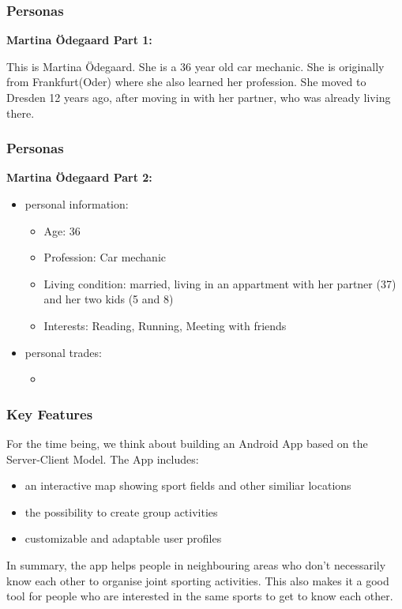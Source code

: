 \documentclass[aspectratio=169]{beamer}
\begin{document}
\begin{frame}   
	\frametitle{Personas}{\textbf{Martina Ödegaard Part 1:}}

	This is Martina Ödegaard. She is a 36 year old car mechanic. She is originally from Frankfurt(Oder) where she also learned her profession. She moved to Dresden 12 years ago, after moving in with her partner, who was already living there. 
\end{frame}

\begin{frame}   
	\frametitle{Personas}{\textbf{Martina Ödegaard Part 2:}}

\begin{itemize}
	\item personal information:
	\begin{itemize}
		\item Age: 36
		\item Profession: Car mechanic
		\item Living condition: married, living in an appartment with her partner (37) and her two kids (5 and 8)
		\item Interests: Reading, Running, Meeting with friends
	\end{itemize}
	\item personal trades:
	\begin{itemize}
		\item
\end{itemize}
\end{itemize}

\end{frame}


\begin{frame}
\frametitle{Key Features}
For the time being, we think about building an Android App based on the
Server-Client Model. The App includes:

\begin{itemize}
	\item an interactive map showing sport fields and other similiar locations
	\item the possibility to create group activities
	\item customizable and adaptable user profiles 
\end{itemize}
In summary, the app helps people in neighbouring areas who don’t necessarily
know each other to organise joint sporting activities. This also makes it a good tool
for people who are interested in the same sports to get to know each other.
\end{frame}
\end{document}
